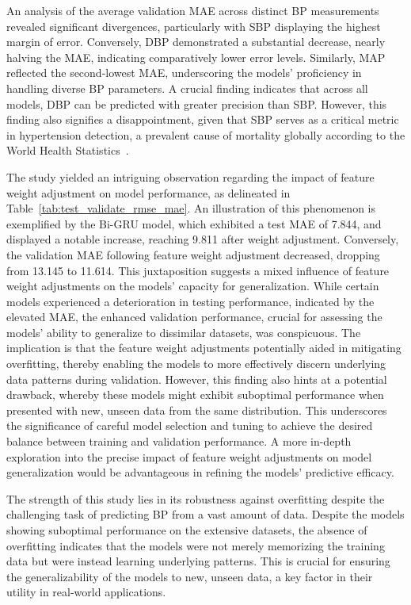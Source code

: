 An analysis of the average validation MAE across distinct BP measurements revealed significant divergences, particularly with SBP displaying the highest margin of error.
Conversely, DBP demonstrated a substantial decrease, nearly halving the MAE, indicating comparatively lower error levels.
Similarly, MAP reflected the second-lowest MAE, underscoring the models' proficiency in handling diverse BP parameters.
A crucial finding indicates that across all models, DBP can be predicted with greater precision than SBP\@.
However, this finding also signifies a disappointment, given that SBP serves as a critical metric in hypertension detection,
a prevalent cause of mortality globally according to the World Health Statistics~\cite{WorldHealthStatistics2023}.

The study yielded an intriguing observation regarding the impact of feature weight adjustment on model performance, as delineated in Table~\ref{tab:test_validate_rmse_mae}.
An illustration of this phenomenon is exemplified by the Bi-GRU model, which exhibited a test MAE of 7.844, and displayed a notable increase, reaching 9.811 after weight adjustment.
Conversely, the validation MAE following feature weight adjustment decreased, dropping from 13.145 to 11.614.
This juxtaposition suggests a mixed influence of feature weight adjustments on the models' capacity for generalization.
While certain models experienced a deterioration in testing performance, indicated by the elevated MAE, the enhanced validation performance,
crucial for assessing the models' ability to generalize to dissimilar datasets, was conspicuous.
The implication is that the feature weight adjustments potentially aided in mitigating overfitting, thereby enabling the models to more effectively discern underlying data patterns during validation.
However, this finding also hints at a potential drawback, whereby these models might exhibit suboptimal performance when presented with new, unseen data from the same distribution.
This underscores the significance of careful model selection and tuning to achieve the desired balance between training and validation performance.
A more in-depth exploration into the precise impact of feature weight adjustments on model generalization would be advantageous in refining the models' predictive efficacy.

The strength of this study lies in its robustness against overfitting despite the challenging task of predicting BP from a vast amount of data.
Despite the models showing suboptimal performance on the extensive datasets, the absence of overfitting indicates that the models were not merely memorizing the training data but were instead learning underlying patterns.
This is crucial for ensuring the generalizability of the models to new, unseen data, a key factor in their utility in real-world applications.

